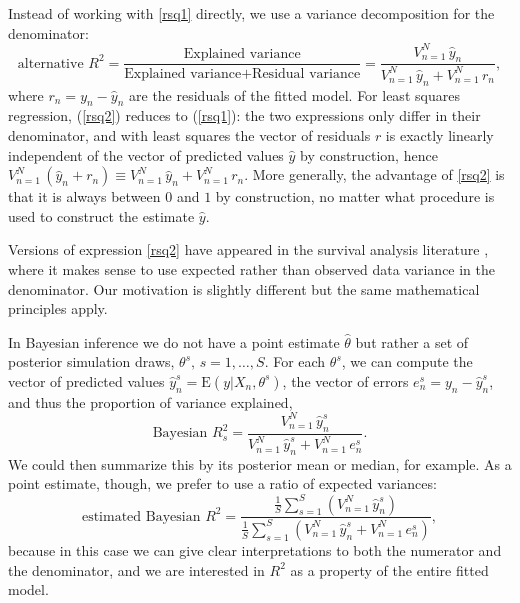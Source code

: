\documentclass[11pt]{article}
\begin{document}
Instead of working with \eqref{rsq1} directly, we use a variance decomposition for the denominator:
%
\begin{equation}\label{rsq2}
\mbox{alternative } R^2 = \frac{\mbox{Explained variance}}{\mbox{Explained variance} + \mbox{Residual variance}} =
	\frac{V_{n=1}^N \,\hat{y}_n}{V_{n=1}^N \,\hat{y}_n  + V_{n=1}^N \,r_n},
\end{equation}
%
where $r_n = y_n - \hat{y}_n$ are the residuals of the fitted model.
For least squares regression, (\ref{rsq2}) reduces to (\ref{rsq1}):  the two expressions only differ in their denominator, and with least squares the vector of residuals $r$ is exactly linearly independent of the vector of predicted values $\hat{y}$ by construction, hence $V_{n=1}^N \, (\hat{y}_n+r_n) \equiv V_{n=1}^N \,\hat{y}_n  + V_{n=1}^N \,r_n$.
More generally, the advantage of \eqref{rsq2} is that it is always between $0$ and $1$ by
construction, no matter what procedure is used to construct the estimate
$\hat{y}$.

Versions of expression \eqref{rsq2} have appeared in the survival analysis
literature \citep{KentOquigley1988, ChoodariRoystonParmar2010},
where it makes sense to use expected rather than observed data variance
in the denominator.  Our motivation is slightly different but the same
mathematical principles apply.

In Bayesian inference we do not have a point estimate $\hat{\theta}$ but rather
a set of posterior simulation draws, $\theta^s, \,s=1,\ldots,S$.
For each $\theta^s$, we can compute the vector of predicted values
$\hat{y}_n^s = \mbox{E}(y | X_n, \theta^s)$, the vector of errors
$e_n^s = y_n - \hat{y}_n^s$, and thus the proportion of variance explained,
%
\begin{equation}\label{rsq3}
\mbox{Bayesian } R^2_s = 
	\frac{V_{n=1}^N \,\hat{y}_n^s}{V_{n=1}^N \,\hat{y}_n^s  + V_{n=1}^N \,e_n^s}.
\end{equation}
%
We could then summarize this by its posterior mean or median, for example.  As a point estimate, though, we prefer to use a ratio of expected variances:
\begin{equation}\label{rsq4}
\mbox{estimated Bayesian } R^2 =
\frac{\frac{1}{S}\sum_{s=1}^S\left(V_{n=1}^N \,\hat{y}_n^s\right)}{\frac{1}{S}\sum_{s=1}^S\left(V_{n=1}^N \,\hat{y}_n^s  + V_{n=1}^N \,e_n^s\right)},
\end{equation}
because in this case we can give clear interpretations to both the numerator and the denominator, and we are interested in $R^2$ as a property of the entire fitted model.
\end{document}

